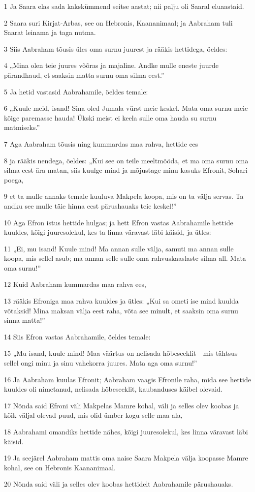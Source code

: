 \par 1 Ja Saara elas sada kakskümmend seitse aastat; nii palju oli Saaral eluaastaid.
\par 2 Saara suri Kirjat-Arbas, see on Hebronis, Kaananimaal; ja Aabraham tuli Saarat leinama ja taga nutma.
\par 3 Siis Aabraham tõusis üles oma surnu juurest ja rääkis hettidega, öeldes:
\par 4 „Mina olen teie juures võõras ja majaline. Andke mulle eneste juurde pärandhaud, et saaksin matta surnu oma silma eest.”
\par 5 Ja hetid vastasid Aabrahamile, öeldes temale:
\par 6 „Kuule meid, isand! Sina oled Jumala vürst meie keskel. Mata oma surnu meie kõige paremasse hauda! Ükski meist ei keela sulle oma hauda su surnu matmiseks.”
\par 7 Aga Aabraham tõusis ning kummardas maa rahva, hettide ees
\par 8 ja rääkis nendega, öeldes: „Kui see on teile meeltmööda, et ma oma surnu oma silma eest ära matan, siis kuulge mind ja mõjustage minu kasuks Efronit, Sohari poega,
\par 9 et ta mulle annaks temale kuuluva Makpela koopa, mis on ta välja servas. Ta andku see mulle täie hinna eest pärushauaks teie keskel!”
\par 10 Aga Efron istus hettide hulgas; ja hett Efron vastas Aabrahamile hettide kuuldes, kõigi juuresolekul, kes ta linna väravast läbi käisid, ja ütles:
\par 11 „Ei, mu isand! Kuule mind! Ma annan sulle välja, samuti ma annan sulle koopa, mis sellel asub; ma annan selle sulle oma rahvuskaaslaste silma all. Mata oma surnu!”
\par 12 Kuid Aabraham kummardas maa rahva ees,
\par 13 rääkis Efroniga maa rahva kuuldes ja ütles: „Kui sa ometi ise mind kuulda võtaksid! Mina maksan välja eest raha, võta see minult, et saaksin oma surnu sinna matta!”
\par 14 Siis Efron vastas Aabrahamile, öeldes temale:
\par 15 „Mu isand, kuule mind! Maa väärtus on nelisada hõbeseeklit - mis tähtsus sellel ongi minu ja sinu vahekorra juures. Mata aga oma surnu!”
\par 16 Ja Aabraham kuulas Efronit; Aabraham vaagis Efronile raha, mida see hettide kuuldes oli nimetanud, nelisada hõbeseeklit, kaubanduses käibel olevaid.
\par 17 Nõnda said Efroni väli Makpelas Mamre kohal, väli ja selles olev koobas ja kõik väljal olevad puud, mis olid ümber kogu selle maa-ala,
\par 18 Aabrahami omandiks hettide nähes, kõigi juuresolekul, kes linna väravast läbi käisid.
\par 19 Ja seejärel Aabraham mattis oma naise Saara Makpela välja koopasse Mamre kohal, see on Hebronis Kaananimaal.
\par 20 Nõnda said väli ja selles olev koobas hettidelt Aabrahamile pärushauaks.

